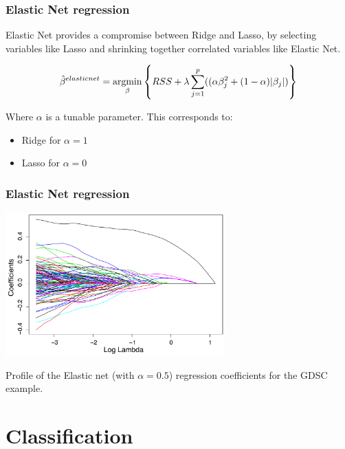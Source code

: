\documentclass[notes]{beamer}          %
\newcommand{\argmin}{\operatornamewithlimits{argmin}}
\begin{document}
\begin{frame}
\frametitle{Elastic Net regression}

Elastic Net provides a compromise between Ridge and Lasso, by selecting variables like Lasso and shrinking together correlated variables like Elastic Net.


\begin{equation*}
    \hat{\beta}^{elastic net} =  \argmin_{\beta} \left\{ RSS + \lambda \sum_{j=1}^p ((\alpha \beta_j^2 + (1-\alpha)| \beta_j |) \right\}
\end{equation*}

Where $\alpha$ is a tunable parameter. This corresponds to:

\begin{itemize}
    \item Ridge for $\alpha=1$
    \item Lasso for $\alpha=0$
\end{itemize}

\end{frame}

\begin{frame}
\frametitle{Elastic Net regression}

\begin{center}
\includegraphics[height=5.5cm]{../figures/week_2_linear_models/ElasticNet_regression_coefficinets.pdf}
\end{center}

Profile of the Elastic net (with $\alpha=0.5$) regression coefficients for the GDSC example.

\end{frame}

\section{Classification}
\end{document}
